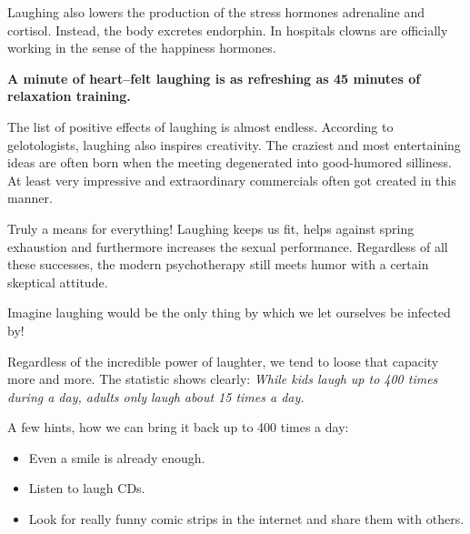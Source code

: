 \documentclass[../Book.Stress_regulation.tex]{subfiles}
\begin{document}
Laughing also lowers the production of the stress hormones adrenaline and cortisol.
Instead, the body excretes endorphin.
In hospitals clowns are officially working in the sense of the happiness hormones.

\textbf{A minute of heart--felt laughing is as refreshing as 45 minutes of relaxation training.}

The list of positive effects of laughing is almost endless.
According to gelotologists, laughing also inspires creativity.
The craziest and most entertaining ideas are often born when the meeting degenerated into good-humored silliness.
At least very impressive and extraordinary commercials often got created in this manner.

Truly a means for everything!
Laughing keeps us fit, helps against spring exhaustion and furthermore increases the sexual performance.
Regardless of all these successes, the modern psychotherapy still meets humor with a certain skeptical attitude.

Imagine laughing would be the only thing by which we let ourselves be infected by!

Regardless of the incredible power of laughter, we tend to loose that capacity more and more.
The statistic shows clearly: \emph{While kids laugh up to 400 times during a day, adults only laugh about 15 times a day.}

A few hints, how we can bring it back up to 400 times a day:
\begin{itemize}
\item Even a smile is already enough.
\item Listen to laugh CDs.
\item Look for really funny comic strips in the internet and share them with others.
\end{itemize}

\vspace{1cm}

\end{document}
